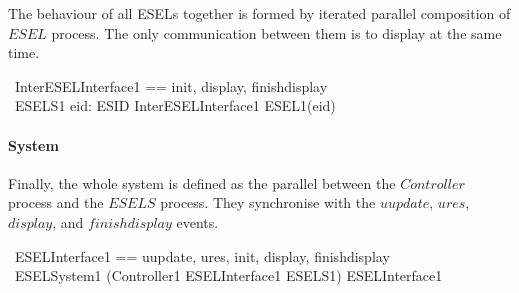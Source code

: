 The behaviour of all ESELs together is formed by iterated parallel composition of $ESEL$ process. The only communication between them is to display at the same time.
\begin{circus}
    \circchannelset\ InterESELInterface1 == \lchanset init, display, finishdisplay \rchanset \\
    \circprocess\ ESELS1 \circdef \Parallel eid: ESID \lpar InterESELInterface1 \rpar \circspot ESEL1(eid)
\end{circus}

\paragraph{System}
Finally, the whole system is defined as the parallel between the $Controller$ process and the $ESELS$ process. They synchronise with the $uupdate$, $ures$, $display$, and $finishdisplay$ events.
\begin{circus}
    \circchannelset\ ESELInterface1 == \lchanset uupdate, ures, init, display, finishdisplay \rchanset \\
    \circprocess\ ESELSystem1 \circdef (Controller1 \lpar ESELInterface1 \rpar ESELS1) \circhide ESELInterface1
\end{circus}

